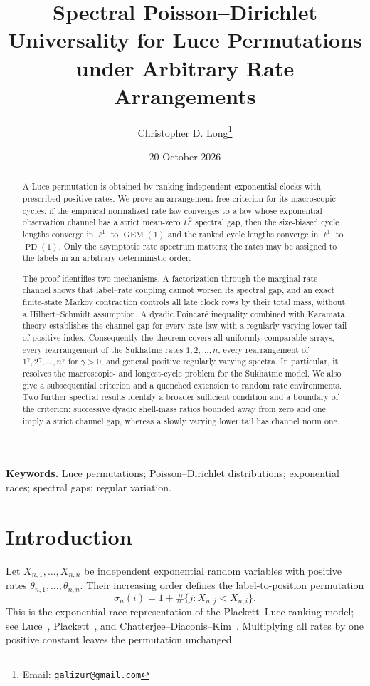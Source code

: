 \documentclass[11pt]{article}
\title{Spectral Poisson--Dirichlet Universality for Luce Permutations\\
       under Arbitrary Rate Arrangements}
\author{Christopher D. Long\thanks{Email: \texttt{galizur@gmail.com}}}
\date{20 October 2026}
\theoremstyle{definition}
\theoremstyle{remark}
\newcommand{\PD}{\operatorname{PD}}
\newcommand{\GEM}{\operatorname{GEM}}
\begin{document}
\maketitle

\begin{abstract}
A Luce permutation is obtained by ranking independent exponential clocks with
prescribed positive rates.  We prove an arrangement-free criterion for its
macroscopic cycles: if the empirical normalized rate law converges to a law
whose exponential observation channel has a strict mean-zero $L^2$ spectral
gap, then the size-biased cycle lengths converge in $\ell^1$ to $\GEM(1)$ and
the ranked cycle lengths converge in $\ell^1$ to $\PD(1)$.  Only the
asymptotic rate spectrum matters; the rates may be assigned to the labels in
an arbitrary deterministic order.

The proof identifies two mechanisms.  A factorization through the marginal
rate channel shows that label--rate coupling cannot worsen its spectral gap,
and an exact finite-state Markov contraction controls all late clock rows by
their total mass, without a Hilbert--Schmidt assumption.  A dyadic
Poincar\'e inequality combined with Karamata theory establishes the channel
gap for every rate law with a regularly varying lower tail of positive index.
Consequently the theorem covers all uniformly comparable arrays, every
rearrangement of the Sukhatme rates $1,2,\ldots,n$, every rearrangement of
$1^\gamma,2^\gamma,\ldots,n^\gamma$ for $\gamma>0$, and general positive
regularly varying spectra.  In particular, it resolves the macroscopic- and
longest-cycle problem for the Sukhatme model.  We also give a subsequential
criterion and a quenched extension to random rate environments.  Two further
spectral results identify a broader sufficient condition and a boundary of the
criterion: successive dyadic shell-mass ratios bounded away from zero and one
imply a strict channel gap, whereas a slowly varying lower tail has channel
norm one.
\end{abstract}

\medskip
\noindent\textbf{Keywords.}
Luce permutations; Poisson--Dirichlet distributions; exponential races;
spectral gaps; regular variation.

\section{Introduction}
\label{sec:introduction}

Let $X_{n,1},\ldots,X_{n,n}$ be independent exponential random variables with
positive rates $\theta_{n,1},\ldots,\theta_{n,n}$.  Their increasing order
defines the label-to-position permutation
\begin{equation}
  \sigma_n(i)=1+\#\{j:X_{n,j}<X_{n,i}\}.
  \label{eq:luce-permutation}
\end{equation}
This is the exponential-race representation of the Plackett--Luce ranking
model; see Luce~\cite{Luce1959}, Plackett~\cite{Plackett1975}, and
Chatterjee--Diaconis--Kim~\cite{CDK2024}.  Multiplying all rates by one
positive constant leaves the permutation unchanged.
\end{document}
